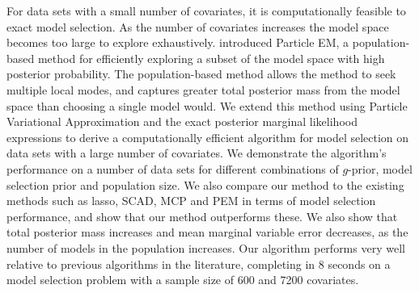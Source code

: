 \documentclass[PhD,stats]{usydthesis}[12pt]
\begin{document}
For data sets with a small number of covariates, it is computationally feasible to exact model selection. As
the number of covariates increases the model space becomes too large to explore exhaustively.
\cite{Rockova2017} introduced Particle EM, a population-based method for efficiently exploring a  subset of
the model space with high posterior probability. The population-based method allows the method to seek
multiple local modes, and captures greater total posterior mass from the model space than choosing a single
model would. We extend this method using Particle Variational Approximation and the exact posterior marginal
likelihood expressions to derive a computationally efficient algorithm for model selection on data sets with a
large number of covariates. We demonstrate the algorithm's performance on a number of data sets for different
combinations of $g$-prior, model selection prior and population size. We also compare our method to the
existing methods such as lasso, SCAD, MCP and PEM in terms of model selection performance,  and show that our
method outperforms these. We also show that total posterior mass increases and mean marginal variable error
decreases, as the number of models in the population increases.
Our algorithm performs very well relative to previous algorithms in the literature, completing in 8 seconds
on a model selection problem with a sample size of 600 and 7200 covariates.








% 

\backmatter
\appendix



\end{document}
